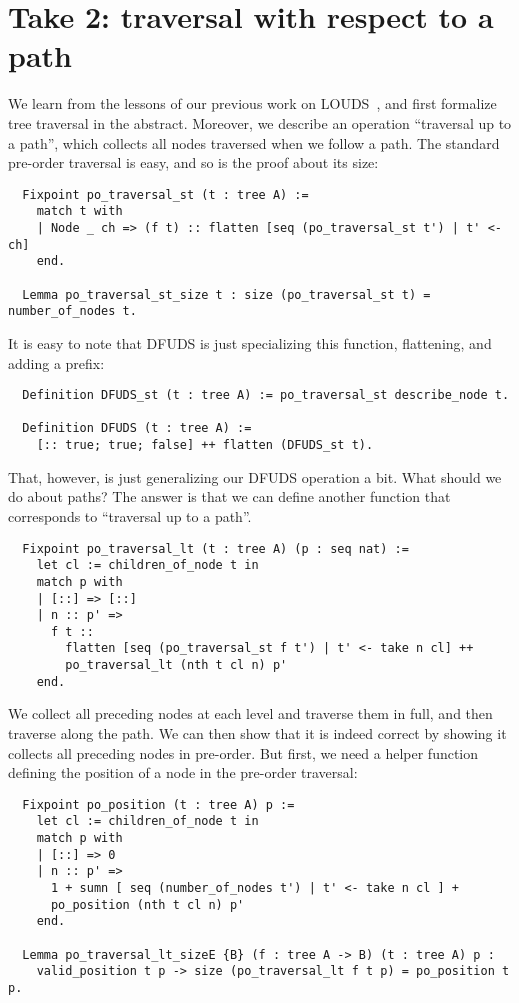 \documentclass[11pt]{article}
\begin{document}
\section{Take 2: traversal with respect to a path}
We learn from the lessons of our previous work on LOUDS~\cite{succinct}, and first formalize tree traversal in the abstract. Moreover, we
describe an operation ``traversal up to a path'', which collects all nodes traversed when we follow a path. The standard pre-order traversal
is easy, and so is the proof about its size:

\begin{verbatim}
  Fixpoint po_traversal_st (t : tree A) :=
    match t with
    | Node _ ch => (f t) :: flatten [seq (po_traversal_st t') | t' <- ch]
    end.

  Lemma po_traversal_st_size t : size (po_traversal_st t) = number_of_nodes t.
\end{verbatim}

It is easy to note that DFUDS is just specializing this function, flattening, and adding a prefix:

\begin{verbatim}
  Definition DFUDS_st (t : tree A) := po_traversal_st describe_node t.
  
  Definition DFUDS (t : tree A) :=
    [:: true; true; false] ++ flatten (DFUDS_st t).
\end{verbatim}

That, however, is just generalizing our DFUDS operation a bit. What should we do about paths? The answer is that we can define another function
that corresponds to ``traversal up to a path''.

\begin{verbatim}
  Fixpoint po_traversal_lt (t : tree A) (p : seq nat) :=
    let cl := children_of_node t in
    match p with
    | [::] => [::]
    | n :: p' =>
      f t ::
        flatten [seq (po_traversal_st f t') | t' <- take n cl] ++
        po_traversal_lt (nth t cl n) p'
    end.
\end{verbatim}

We collect all preceding nodes at each level and traverse them in full, and then traverse along the path. We can then show that it
is indeed correct by showing it collects all preceding nodes in pre-order. But first, we need a helper function defining the position
of a node in the pre-order traversal:

\begin{verbatim}
  Fixpoint po_position (t : tree A) p :=
    let cl := children_of_node t in
    match p with
    | [::] => 0
    | n :: p' =>
      1 + sumn [ seq (number_of_nodes t') | t' <- take n cl ] +
      po_position (nth t cl n) p'
    end.

  Lemma po_traversal_lt_sizeE {B} (f : tree A -> B) (t : tree A) p :
    valid_position t p -> size (po_traversal_lt f t p) = po_position t p.  
\end{verbatim}
\end{document}

